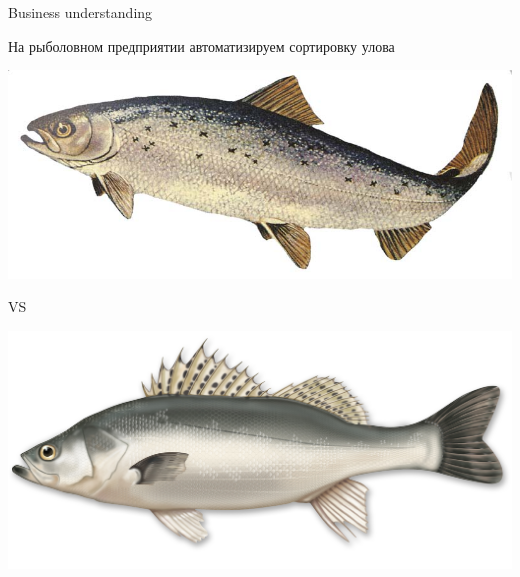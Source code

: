 \documentclass[10pt,a4paper]{beamer}
\begin{document}
\begin{frame}{Business understanding}

На рыболовном предприятии автоматизируем сортировку улова

\begin{center}
\includegraphics[scale=0.2]{images/salmon.jpg}

VS

\includegraphics[scale=0.2]{images/seabass.jpg}
\end{center}

\end{frame}

\end{document}
